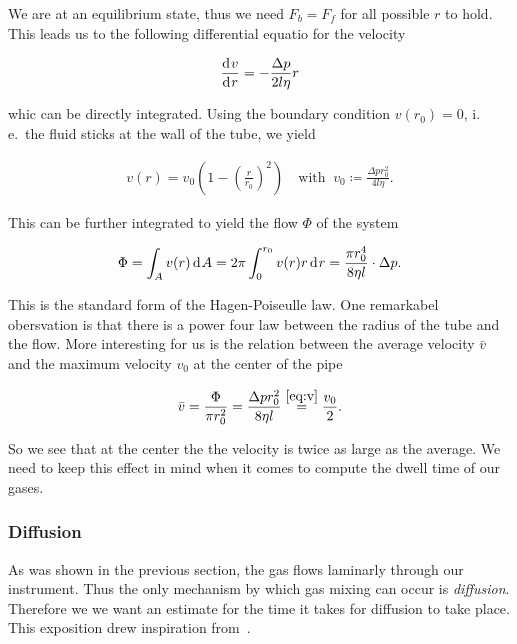 We are at an equilibrium state, thus we need $F_b = F_f$ for all
possible $r$ to hold. This leads us to the following differential
equatio for the velocity

\begin{align*}
  \frac{\d[v]}{\d[r]} = - \frac{\Delta p}{2l\eta} r
\end{align*}
 
whic can be directly integrated. Using the boundary condition $v(r_0)
= 0$, i.\,e.\ the fluid sticks at the wall of the tube, we yield

\begin{align}
  v(r) = v_0 \left ( 1 - \left( \frac{r}{r_0} \right)^2 \right) \quad
  \text{with }\ v_0 \coloneqq \frac{\Delta p r_0^2}{4 l \eta}. \label{eq:v}
\end{align}

This can be further integrated to yield the flow $\Phi$ of the system

\begin{align*}
  \Phi = \int_A v(r) \d[A] = 2\pi \int_0^{r_0} v(r)r \d[r] = \frac{\pi
  r_0^4}{8\eta l} \cdot \Delta p.
\end{align*}

This is the standard form of the Hagen-Poiseulle law. One remarkabel
obersvation is that there is a power four law between the radius of
the tube and the flow. More interesting for us is the relation between
the average velocity $\bar v$ and the maximum velocity $v_0$ at the
center of the pipe

\begin{align*}
  \bar v = \frac{\Phi}{\pi r_0^2} = \frac{\Delta p r_0^2}{8\eta l} \stackrel{\eqref{eq:v}}{=} \frac{v_0}{2}.
\end{align*}

So we see that at the center the the velocity is twice as large as the
average. We need to keep this effect in mind when it comes to compute
the dwell time of our gases.

\subsubsection{Diffusion}
\label{sec:diffusion}

As was shown in the previous section, the gas flows laminarly through
our instrument. Thus the only mechanism by which gas mixing can occur
is \emph{diffusion}. Therefore we we want an estimate for the time it
takes for diffusion to take place. This exposition drew inspiration
from~\cite{fluid}.

